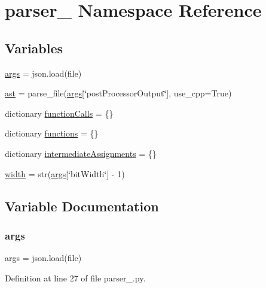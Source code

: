 \hypertarget{namespaceparser__1}{}\section{parser\+\_ Namespace Reference}
\label{namespaceparser__1}
\subsection*{Variables}
\begin{DoxyCompactItemize}
\item 
\hyperlink{namespaceparser__1_a8187411843a6284ffb964ef3fb9fcab3}{args} = json.\+load(file)
\item 
\hyperlink{namespaceparser__1_a83d838e3813fb5999c0492e0d9474bd9}{ast} = parse\+\_\+file(\hyperlink{namespaceparser__1_a8187411843a6284ffb964ef3fb9fcab3}{args}\mbox{[}\char`\"{}post\+Processor\+Output\char`\"{}\mbox{]}, use\+\_\+cpp=True)
\item 
dictionary \hyperlink{namespaceparser__1_a8915929c38e1651aaa8c716f8f8a2f0f}{function\+Calls} = \{\}
\item 
dictionary \hyperlink{namespaceparser__1_ac310aa598d85b31cc0acea80dcc3c083}{functions} = \{\}
\item 
dictionary \hyperlink{namespaceparser__1_a91478035202a21bdb18a2e8f291ab7b5}{intermediate\+Assignments} = \{\}
\item 
\hyperlink{namespaceparser__1_a5558ace5433f9aabbf0a0ec059900d94}{width} = str(\hyperlink{namespaceparser__1_a8187411843a6284ffb964ef3fb9fcab3}{args}\mbox{[}\char`\"{}bit\+Width\char`\"{}\mbox{]} -\/ 1)
\end{DoxyCompactItemize}


\subsection{Variable Documentation}
\mbox{\label{namespaceparser__1_a8187411843a6284ffb964ef3fb9fcab3}} 
\subsubsection{\texorpdfstring{args}{args}}
{\footnotesize\ttfamily args = json.\+load(file)}



Definition at line 27 of file parser\+\_.\+py.

